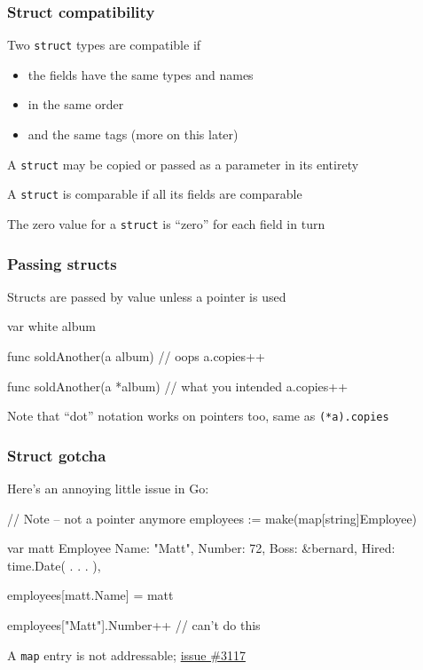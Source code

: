 \documentclass[handout,compress,t,11pt]{beamer}
\begin{document}
\begin{frame}[fragile]
    \frametitle{Struct compatibility}
    Two \verb|struct| types are compatible if
    \begin{itemize}
        \item the fields have the same types and names
        \item in the same order
        \item and the same tags (more on this later)
    \end{itemize}
    \vspace{\baselineskip}
    A \verb|struct| may be copied or passed as a parameter in its entirety \par
    \vspace{\baselineskip}
    A \verb|struct| is comparable if all its fields are comparable \par
    \vspace{\baselineskip}
    The zero value for a \verb|struct| is ``zero'' for each field in turn
\end{frame}

\begin{frame}[fragile]
    \frametitle{Passing structs}
    Structs are passed by value unless a pointer is used
\begin{golang}
var white album

func soldAnother(a album) {
    // oops
    a.copies++
}

func soldAnother(a *album) {
    // what you intended
    a.copies++
}
\end{golang}
\vspace{\baselineskip}
Note that ``dot'' notation works on pointers too, same as \verb|(*a).copies|
\end{frame}

\begin{frame}[fragile]
    \frametitle{Struct gotcha}
    Here's an annoying little issue in Go:
\begin{golang}
// Note -- not a pointer anymore
employees := make(map[string]Employee)

var matt Employee{
    Name:   "Matt",
    Number: 72,
    Boss:   &bernard,
    Hired:  time.Date( . . . ),
}

employees[matt.Name] = matt

employees["Matt"].Number++         // can't do this
\end{golang}
\vspace{0.4\baselineskip}
A \verb|map| entry is not addressable; \href{https://github.com/golang/go/issues/3117}{issue \#3117}
\end{frame}
\end{document}
